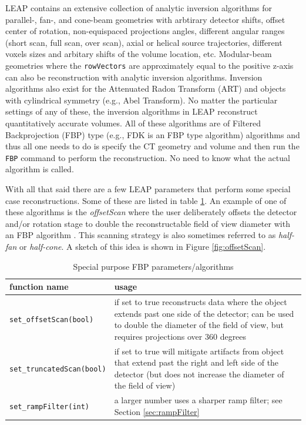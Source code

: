 \documentclass[11pt]{article}
\begin{document}
LEAP contains an extensive collection of analytic inversion algorithms for parallel-, fan-, and cone-beam geometries with arbtirary detector shifts, offset center of rotation, non-equispaced projections angles, different angular ranges (short scan, full scan, over scan), axial or helical source trajectories, different voxels sizes and arbitary shifts of the volume location, etc.  Modular-beam geometries where the \texttt{rowVectors} are approximately equal to the positive z-axis can also be reconstruction with analytic inversion algorithms.  Inversion algorithms also exist for the Attenuated Radon Transform (ART) and objects with cylindrical symmetry (e.g., Abel Transform).  No matter the particular settings of any of these, the inversion algorithms in LEAP reconstruct quantitatively accurate volumes.  All of these algorithms are of Filtered Backprojection (FBP) type (e.g., FDK is an FBP type algorithm) algorithms and thus all one needs to do is specify the CT geometry and volume and then run the \texttt{FBP} command to perform the reconstruction.  No need to know what the actual algorithm is called.

With all that said there are a few LEAP parameters that perform some special case reconstructions.  Some of these are listed in table \ref{tab:FBPparameters}.  An example of one of these algorithms is the \textit{offsetScan} where the user deliberately offsets the detector and/or rotation stage to double the reconstructable field of view diameter with an FBP algorithm \cite{Gullberg_TMI_1986, Gregor_ICI_2003}.  This scanning strategy is also sometimes referred to as \textit{half-fan} or \textit{half-cone}.  A sketch of this idea is shown in Figure \ref{fig:offsetScan}.

\begin{table}[h!] \caption{Special purpose FBP parameters/algorithms} \label{tab:FBPparameters}
\begin{tabular}{l|p{11cm}}
function name & usage \\
\hline
\texttt{set\_offsetScan(bool)} & if set to true reconstructs data where the object extends past one side of the detector; can be used to double the diameter of the field of view, but requires projections over 360 degrees \\
\texttt{set\_truncatedScan(bool)} & if set to true will mitigate artifacts from object that extend past the right and left side of the detector (but does not increase the diameter of the field of view) \\
\texttt{set\_rampFilter(int)} & a larger number uses a sharper ramp filter; see Section \ref{sec:rampFilter}
\end{tabular}
\end{table}
\end{document}
